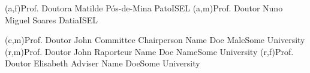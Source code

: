 

\ncmember(a,f){Prof. Doutora Matilde Pós-de-Mina Pato}{ISEL} 
\ncmember(a,m){Prof. Doutor Nuno Miguel Soares Datia}{ISEL}

\ncmember(c,m){Prof. Doutor John Committee Chairperson Name Doe Male}{Some University}
\ncmember(r,m){Prof. Doutor John Raporteur Name Doe Name}{Some University}
\ncmember(r,f){Prof. Doutor Elisabeth Adviser Name Doe}{Some University}


